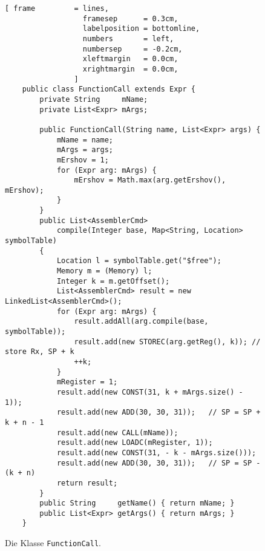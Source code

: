 \begin{figure}[!ht]
\centering
\begin{Verbatim}[ frame         = lines, 
                  framesep      = 0.3cm, 
                  labelposition = bottomline,
                  numbers       = left,
                  numbersep     = -0.2cm,
                  xleftmargin   = 0.0cm,
                  xrightmargin  = 0.0cm,
                ]
    public class FunctionCall extends Expr {
        private String     mName;
        private List<Expr> mArgs;
    
        public FunctionCall(String name, List<Expr> args) {
            mName = name;
            mArgs = args;
            mErshov = 1;
            for (Expr arg: mArgs) {
                mErshov = Math.max(arg.getErshov(), mErshov);
            }
        }
        public List<AssemblerCmd> 
            compile(Integer base, Map<String, Location> symbolTable) 
        {
            Location l = symbolTable.get("$free");
            Memory m = (Memory) l;
            Integer k = m.getOffset();
            List<AssemblerCmd> result = new LinkedList<AssemblerCmd>();
            for (Expr arg: mArgs) {
                result.addAll(arg.compile(base, symbolTable));
                result.add(new STOREC(arg.getReg(), k)); // store Rx, SP + k
                ++k;
            }
            mRegister = 1;
            result.add(new CONST(31, k + mArgs.size() - 1));
            result.add(new ADD(30, 30, 31));   // SP = SP + k + n - 1
            result.add(new CALL(mName));
            result.add(new LOADC(mRegister, 1));
            result.add(new CONST(31, - k - mArgs.size()));
            result.add(new ADD(30, 30, 31));   // SP = SP -(k + n)
            return result;
        }
        public String     getName() { return mName; }
        public List<Expr> getArgs() { return mArgs; }
    }
\end{Verbatim}
\vspace*{-0.3cm} %
\caption{Die Klasse \texttt{FunctionCall}.}
\label{fig:FunctionCall.java-SRP}
\end{figure}

